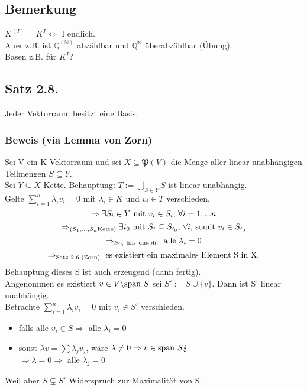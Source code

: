 \documentclass {article}
\newcommand{\tn}[1]{\textnormal {#1}}
\begin{document}
\subsection*{Bemerkung}
$K^{(I)}=K^I \iff$ I endlich. \\
Aber z.B. ist $\mathbb Q^{(\mathbb N)}$ abzählbar und $\mathbb Q^\mathbb N$ überabzählbar (Übung). \\
Basen z.B. für $K^I$?
\subsection*{Satz 2.8.}
Jeder Vektorraum besitzt eine Basis.
\subsubsection*{Beweis (via Lemma von Zorn)}
Sei V ein K-Vektorraum und sei $X \subseteq \mathfrak P(V)$ die Menge aller linear unabhängigen Teilmengen $S \subseteq Y$. \\
Sei $Y\subseteq X$ Kette. Behauptung: $T:=\bigcup_{S\in Y} S$ ist linear unabhängig. \\
Gelte $\sum_{i=1}^n \lambda_i v_i = 0$ mit $\lambda_i \in K$ und $v_i \in T$ verschieden. \\
$$\Rightarrow \exists S_i \in Y\tn{ mit }v_i \in S_i\tn{, }\forall i=1,...n$$
$$\Rightarrow_{\tn(S_1,...,S_n \tn{Kette)}} \exists i_0\tn{ mit }S_i \subseteq S_{i_0}\tn{, } \forall i\tn{, somit }v_i \in S_{i_0}$$
$$\Rightarrow_{S_{i_0}\tn{ lin. unabh.}}\tn{ alle }\lambda_i=0$$
$$\Rightarrow_{\tn{Satz 2.6 (Zorn)}}\tn{ es existiert ein maximales Element S in X.}$$
Behauptung dieses S ist auch erzeugend (dann fertig).\\
Angenommen es existiert $v\in V\backslash\tn{span }S$ sei $S':= S\cup \{v\}$. Dann ist S' linear unabhängig.\\
Betrachte $\sum_{i=1}^n\lambda_iv_i=0$ mit $v_i\in S'$ verschieden.
\begin{itemize}
\item falls alle $v_i\in S \Rightarrow$ alle $\lambda_i = 0$
\item sonst $\lambda v = \sum \lambda_j v_j$, wäre $\lambda \neq 0 \Rightarrow v\in \tn{span }S \lightning$\\
$\Rightarrow \lambda = 0 \Rightarrow$ alle $\lambda_j=0$
\end{itemize}
Weil aber $S\subsetneq S'$ Widerspruch zur Maximalität von S.
\end{document}

